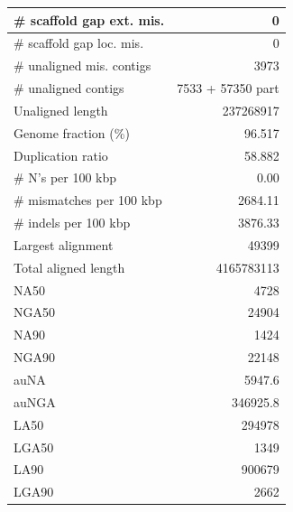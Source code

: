 \documentclass[12pt,a4paper]{article}
\begin{document}
\begin{table}[ht]
\begin{center}
\begin{tabular}{|l*{1}{|r}|}
\# scaffold gap ext. mis. & 0 \\ \hline
\# scaffold gap loc. mis. & 0 \\ \hline
\# unaligned mis. contigs & 3973 \\ \hline
\# unaligned contigs & 7533 + 57350 part \\ \hline
Unaligned length & 237268917 \\ \hline
Genome fraction (\%) & 96.517 \\ \hline
Duplication ratio & 58.882 \\ \hline
\# N's per 100 kbp & 0.00 \\ \hline
\# mismatches per 100 kbp & 2684.11 \\ \hline
\# indels per 100 kbp & 3876.33 \\ \hline
Largest alignment & 49399 \\ \hline
Total aligned length & 4165783113 \\ \hline
NA50 & 4728 \\ \hline
NGA50 & 24904 \\ \hline
NA90 & 1424 \\ \hline
NGA90 & 22148 \\ \hline
auNA & 5947.6 \\ \hline
auNGA & 346925.8 \\ \hline
LA50 & 294978 \\ \hline
LGA50 & 1349 \\ \hline
LA90 & 900679 \\ \hline
LGA90 & 2662 \\ \hline
\end{tabular}
\end{center}
\end{table}
\end{document}
